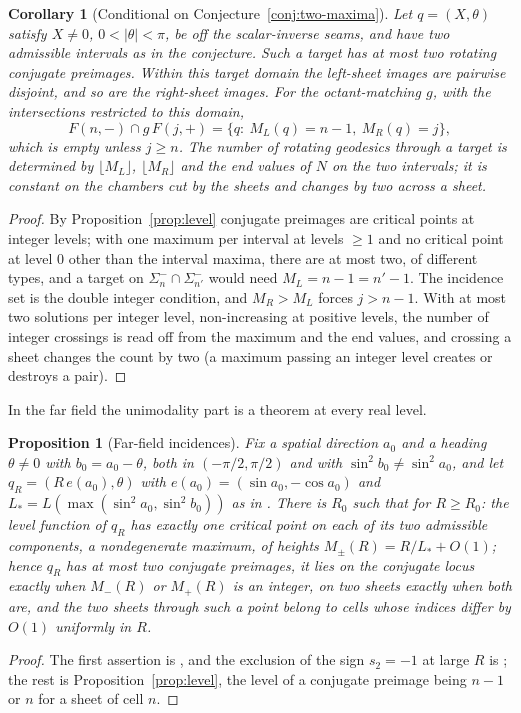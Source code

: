 \documentclass[11pt]{article}
\newtheorem{proposition}[theorem]{Proposition}
\newtheorem{corollary}[theorem]{Corollary}
\theoremstyle{remark}
\begin{document}
\begin{corollary}[Conditional on Conjecture~\ref{conj:two-maxima}]\label{cor:incidence}
Let $q=(X,\theta)$ satisfy $X\ne0$, $0<|\theta|<\pi$, be off the
scalar-inverse seams, and have two admissible intervals as in the
conjecture.  Such a target has at most two rotating conjugate preimages.
Within this target domain the left-sheet images are pairwise disjoint,
and so are the right-sheet images.  For the octant-matching $g$, with
the intersections restricted to this domain,
\[
 F(n,-)\cap g\,F(j,+)=\{q:\ M_L(q)=n-1,\ M_R(q)=j\},
\]
which is empty unless $j\ge n$.  The number of rotating geodesics through
a target is determined by $\lfloor M_L\rfloor$, $\lfloor M_R\rfloor$ and the
end values of $N$ on the two intervals; it is constant on the chambers
cut by the sheets and changes by two across a sheet.
\end{corollary}
\begin{proof}
By Proposition~\ref{prop:level} conjugate preimages are critical points
at integer levels; with one maximum per interval at levels $\ge1$ and
no critical point at level $0$ other than the interval maxima, there
are at most two, of different types, and a target on $\Sigma_n^-\cap\Sigma_{n'}^-$ would need
$M_L=n-1=n'-1$.  The incidence set is the double integer condition, and
$M_R>M_L$ forces $j>n-1$.  With at most two solutions per integer level,
non-increasing at positive levels, the number of integer crossings is read off
from the maximum and the end values, and crossing a sheet changes the
count by two (a maximum passing an integer level creates or destroys a
pair).
\end{proof}

In the far field the unimodality part is a theorem at every real level.

\begin{proposition}[Far-field incidences]\label{prop:far-incidence}
Fix a spatial direction $a_0$ and a heading $\theta\ne0$ with
$b_0=a_0-\theta$, both in $(-\pi/2,\pi/2)$ and with
$\sin^2b_0\ne\sin^2a_0$, and let $q_R=(R\,e(a_0),\theta)$ with
$e(a_0)=(\sin a_0,-\cos a_0)$ and $L_*=L(\max(\sin^2a_0,\sin^2b_0))$ as in
\cite[Section~3]{SE2Counts}.  There is
$R_0$ such that for $R\ge R_0$: the level function of $q_R$ has exactly
one critical point on each of its two admissible components, a
nondegenerate maximum, of heights $M_\pm(R)=R/L_*+O(1)$; hence $q_R$
has at most two conjugate preimages, it lies on the conjugate locus
exactly when $M_-(R)$ or $M_+(R)$ is an integer, on two sheets exactly
when both are, and the two sheets through such a point belong to cells
whose indices differ by $O(1)$ uniformly in $R$.
\end{proposition}
\begin{proof}
The first assertion is \cite[Theorem 3.3]{SE2Counts}, and the exclusion
of the sign $s_2=-1$ at large $R$ is \cite[Section~3]{SE2Counts}; the rest is
Proposition~\ref{prop:level}, the level of a conjugate preimage being
$n-1$ or $n$ for a sheet of cell $n$.
\end{proof}
\end{document}
